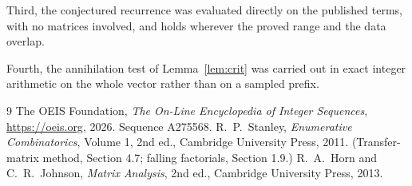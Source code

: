 \documentclass[11pt,a4paper]{article}
\theoremstyle{plain}
\theoremstyle{definition}
\begin{document}
Third, the conjectured recurrence was evaluated directly on the published terms, with no
matrices involved, and holds wherever the proved range and the data overlap.

Fourth, the annihilation test of Lemma~\ref{lem:crit} was carried out in exact integer
arithmetic on the whole vector rather than on a sampled prefix.

\begin{thebibliography}{9}
 The OEIS Foundation, \emph{The On-Line Encyclopedia of Integer
Sequences}, \url{https://oeis.org}, 2026. Sequence A275568.
 R.~P.~Stanley, \emph{Enumerative Combinatorics}, Volume 1, 2nd ed.,
Cambridge University Press, 2011. (Transfer-matrix method, Section 4.7; falling factorials,
Section 1.9.)
 R.~A.~Horn and C.~R.~Johnson, \emph{Matrix Analysis}, 2nd ed., Cambridge
University Press, 2013.
\end{thebibliography}
\end{document}

